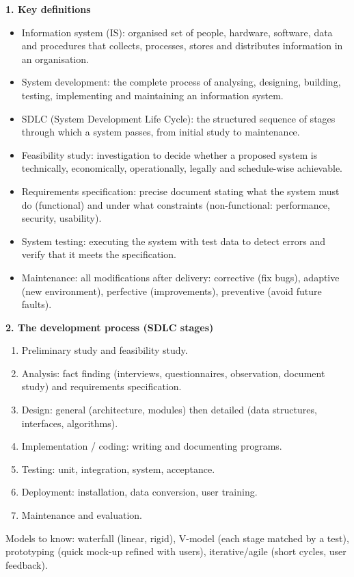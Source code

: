 \documentclass[11pt]{article}
\newcommand{\cle}[1]{{\popxbold\color{popdark}#1}}
\begin{document}
\begin{bilan}
\textbf{1. Key definitions}
\begin{itemize}
\item \cle{Information system (IS)}: organised set of people, hardware, software, data and procedures that collects, processes, stores and distributes information in an organisation.
\item \cle{System development}: the complete process of analysing, designing, building, testing, implementing and maintaining an information system.
\item \cle{SDLC} (System Development Life Cycle): the structured sequence of stages through which a system passes, from initial study to maintenance.
\item \cle{Feasibility study}: investigation to decide whether a proposed system is technically, economically, operationally, legally and schedule-wise achievable.
\item \cle{Requirements specification}: precise document stating what the system must do (functional) and under what constraints (non-functional: performance, security, usability).
\item \cle{System testing}: executing the system with test data to detect errors and verify that it meets the specification.
\item \cle{Maintenance}: all modifications after delivery: corrective (fix bugs), adaptive (new environment), perfective (improvements), preventive (avoid future faults).
\end{itemize}

\textbf{2. The development process (SDLC stages)}
\begin{enumerate}
\item Preliminary study and \cle{feasibility study}.
\item \cle{Analysis}: fact finding (interviews, questionnaires, observation, document study) and requirements specification.
\item \cle{Design}: general (architecture, modules) then detailed (data structures, interfaces, algorithms).
\item \cle{Implementation / coding}: writing and documenting programs.
\item \cle{Testing}: unit, integration, system, acceptance.
\item \cle{Deployment}: installation, data conversion, user training.
\item \cle{Maintenance} and evaluation.
\end{enumerate}
Models to know: \cle{waterfall} (linear, rigid), \cle{V-model} (each stage matched by a test), \cle{prototyping} (quick mock-up refined with users), \cle{iterative/agile} (short cycles, user feedback).


\end{bilan}
\end{document}
